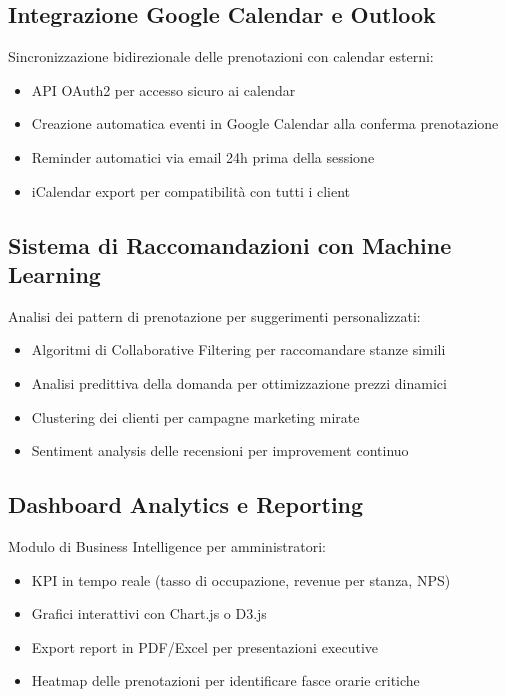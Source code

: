 \subsection{Integrazione Google Calendar e Outlook}
Sincronizzazione bidirezionale delle prenotazioni con calendar esterni:
\begin{itemize}
    \item API OAuth2 per accesso sicuro ai calendar
    \item Creazione automatica eventi in Google Calendar alla conferma prenotazione
    \item Reminder automatici via email 24h prima della sessione
    \item iCalendar export per compatibilità con tutti i client
\end{itemize}

\subsection{Sistema di Raccomandazioni con Machine Learning}
Analisi dei pattern di prenotazione per suggerimenti personalizzati:
\begin{itemize}
    \item Algoritmi di Collaborative Filtering per raccomandare stanze simili
    \item Analisi predittiva della domanda per ottimizzazione prezzi dinamici
    \item Clustering dei clienti per campagne marketing mirate
    \item Sentiment analysis delle recensioni per improvement continuo
\end{itemize}

\subsection{Dashboard Analytics e Reporting}
Modulo di Business Intelligence per amministratori:
\begin{itemize}
    \item KPI in tempo reale (tasso di occupazione, revenue per stanza, NPS)
    \item Grafici interattivi con Chart.js o D3.js
    \item Export report in PDF/Excel per presentazioni executive
    \item Heatmap delle prenotazioni per identificare fasce orarie critiche
\end{itemize}

